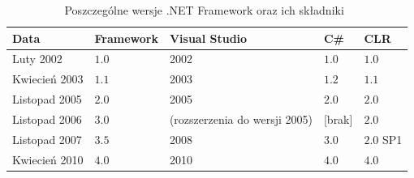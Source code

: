 \begin{table}
	\centering
	\begin{tabular}{|l|l|l|l|l|} \hline
	\textbf{Data} & \textbf{Framework} & \textbf{Visual Studio} & \textbf{C\#} & \textbf{CLR} \\ \hline
	Luty 2002 & $1.0$ & 2002 & $1.0$ & $1.0$ \\ 
	Kwiecień 2003 & $1.1$ & 2003 & $1.2$ & $1.1$ \\ 
	Listopad 2005 & $2.0$ & 2005 & $2.0$ & $2.0$ \\ 
	Listopad 2006 & $3.0$ & (rozszerzenia do wersji 2005) & [brak] & $2.0$ \\ 
	Listopad 2007 & $3.5$ & 2008 & $3.0$ & $2.0$ SP1 \\ 
	Kwiecień 2010 & $4.0$ & 2010 & $4.0$ & $4.0$ \\ \hline
	\end{tabular}
	\caption{Poszczególne wersje .NET Framework oraz ich składniki~\cite{cSharp:inDepthS}\label{dotNet:dates}}
\end{table}


